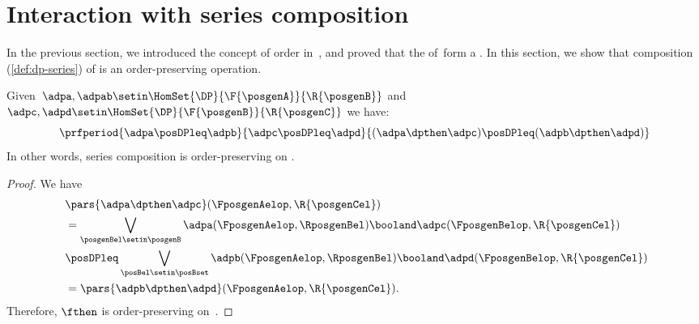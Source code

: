 
\section{Interaction with series composition}
In the previous section, we introduced the concept of order in~\DP, and proved that the  of~\DP form a .
In this section, we show that composition (\cref{def:dp-series}) of  is an order-preserving operation.

\begin{lemma}
    \label{lem:series_pres_order}
    Given~$\adpa,\adpab \setin \HomSet{\DP}{\F{\posgenA}}{\R{\posgenB}}$ and~$\adpc,\adpd \setin \HomSet{\DP}{\F{\posgenB}}{\R{\posgenC}}$ we have:
    \begin{equation}
        \prfperiod{
            \adpa\posDPleq \adpb
        }{
            \adpc\posDPleq \adpd
        }{
            (\adpa\dpthen \adpc) \posDPleq (\adpb\dpthen \adpd)
        }
    \end{equation}
    In other words, series composition is order-preserving on \DP.
\end{lemma}
\begin{proof}
    We have
    \begin{equation}
        \label{eq:series_pres_ord}
        \begin{aligned}
            ~ & \pars{ \adpa\dpthen \adpc}(\FposgenAelop,\R{\posgenCel}) \\
              & = \bigvee_{\posgenBel\setin \posgenB}\adpa(\FposgenAelop,\RposgenBel)\booland \adpc(\FposgenBelop,\R{\posgenCel}) \\
              & \posDPleq \bigvee_{\posBel\setin \posBset} \adpb(\FposgenAelop,\RposgenBel)\booland \adpd(\FposgenBelop,\R{\posgenCel}) \\
              & =\pars{ \adpb\dpthen \adpd}(\FposgenAelop,\R{\posgenCel}).
        \end{aligned}
    \end{equation}
    Therefore, $\fthen$ is order-preserving on~\DP.
\end{proof}

